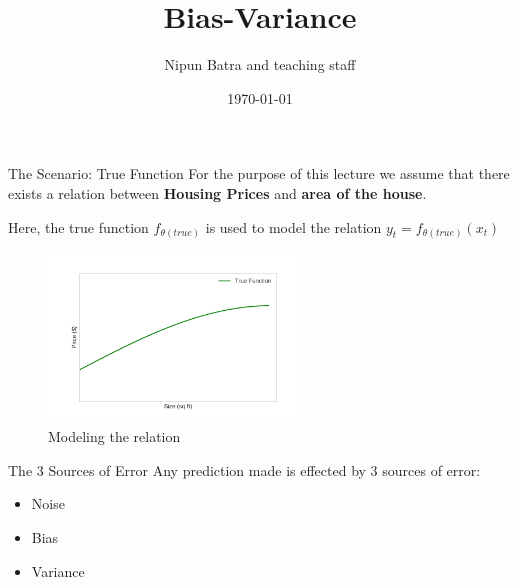 \documentclass{beamer}
\title{Bias-Variance}
\date{\today}
\author{Nipun Batra and teaching staff}
\institute{IIT Gandhinagar}
\begin{document}
	\maketitle

\begin{frame}{The Scenario: True Function}
\vspace*{0.4cm}
For the purpose of this lecture we assume that there exists a relation between \textbf{Housing Prices} and \textbf{area of the house}.
\pause

Here, the true function $f_{\theta (true)}$ is used to model the relation $y_t = f_{\theta (true)}(x_t)$
\begin{figure}
\includegraphics[width=0.6\textwidth]{../assets/bias-variance/figures/true.pdf}
\vspace*{-0.3cm}
\caption{Modeling the relation}
\end{figure}
\end{frame}

\begin{frame}{The 3 Sources of Error}
Any prediction made is effected by 3 sources of error:
\begin{itemize}
\item Noise
\item Bias
\item Variance
\end{itemize}
\end{frame}
\end{document}
